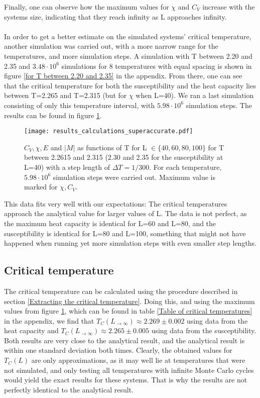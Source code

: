\documentclass[10pt,a4paper]{article}
\begin{document}
Finally, one can observe how the maximum values for $\chi$ and $C_V$ increase with the systems size, indicating that they reach infinity as L approaches infinity.\\\\
In order to get a better estimate on the simulated systems' critical temperature, another simulation was carried out, with a more narrow range for the temperatures, and more simulation steps. A simulation with T between 2.20 and 2.35 and $3.48\cdot10^6$ simulations for 8 temperatures with equal spacing is shown in figure \ref{for T between 2.20 and 2.35} in the appendix. From there, one can see that the critical temperature for both the susceptibility and the heat capacity lies between T=2.265 and T=2.315 (but for $\chi$ when L=40). We ran a last simulation consisting of only this temperature interval, with $5.98\cdot10^6$ simulation steps. The results can be found in figure \ref{Superaccurate critical temperature plot}. 
\begin{figure}[H]
\texttt{[image: results\_calculations\_superaccurate.pdf]}
\caption[$C_V,\chi,E, |M|$ for T between 2.2615 and 2.315]{$C_V,\chi,E$ and $|M|$ as functions of T for  L $ \in \{40,60,80,100\}$ for T between 2.2615 and 2.315 (2.30 and 2.35 for the susceptibility at L=40) with a step length of $\Delta T=1/300$. For each temperature, $5.98\cdot10^6$ simulation steps were carried out. Maximum value is marked for $\chi,C_V$.}\label{Superaccurate critical temperature plot}
\end{figure}
This data fits very well with our expectations: The critical temperatures approach the analytical value for larger values of L. The data is not perfect, as the maximum heat capacity is identical for L=60 and L=80, and the susceptibility is identical for L=80 and L=100, something that might not have happened when running yet more simulation steps with even smaller step lengths. 
\subsection{Critical temperature}
The critical temperature can be calculated using the procedure described in section \ref{Extracting the critical temperature}. Doing this, and using the maximum values from figure \ref{Superaccurate critical temperature plot}, which can be found in table \ref{Table of critical temperatures} in the appendix, we find that $T_C(L_{\rightarrow \infty})\approx2.269\pm0.002$ using data from the heat capacity and  $T_C(L_{\rightarrow \infty})\approx2.265\pm0.005$ using data from the susceptibility. Both results are very close to the analytical result, and the analytical result is within one standard deviation both times. Clearly, the obtained values for $T_C(L)$ are only approximations, as it may well lie at temperatures that were not simulated, and only testing all temperatures with infinite Monte Carlo cycles would yield the exact results for these systems. That is why the results are not perfectly identical to the analytical result.
\end{document}
